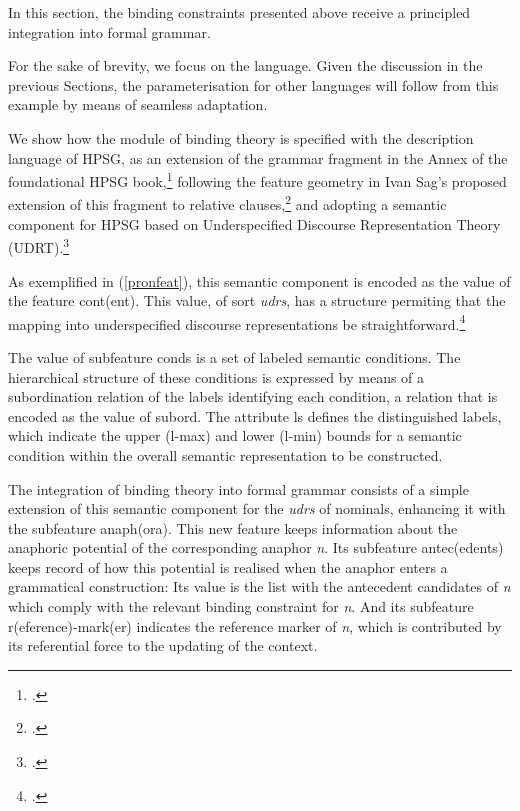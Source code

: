 \documentclass[output=paper
,modfonts
,nonflat]{langsci/langscibook}
\begin{document}
In this section, the binding constraints presented above receive
a principled integration into formal grammar. 

For the sake of brevity, 
we focus on the  language. Given the discussion in the previous Sections,
the parameterisation for other languages will follow from this example by means of seamless adaptation.

We show how the module of binding theory is specified 
with the description language of HPSG,
as an extension of the grammar fragment in the Annex of the foundational
HPSG book,\footnote{
\citep[Annex]{polsag:hpsg94}.}
following the feature geometry in Ivan Sag's proposed extension of this fragment to relative clauses,\footnote{
\citep{Sag97a}.} and adopting a semantic component 
for HPSG based on Underspecified Discourse Representation Theory (UDRT).\footnote{
\citep{frank:sem95}.}

As exemplified in (\ref{pronfeat}), this semantic component is encoded as the value of the 
feature {\sc cont(ent)}. This value, of sort \emph{udrs}, has a structure permiting that the mapping 
into underspecified discourse representations be straightforward.\footnote{
\citep{reyle:udrt93}.}


The value of subfeature {\sc conds} is a set of labeled
semantic conditions. The hierarchical structure of
these conditions is expressed by means of a subordination relation
of the labels identifying each condition, a relation that
is encoded as the value of {\sc subord}. The attribute {\sc ls} defines
the distinguished labels, which indicate the upper ({\sc l-max}) and
lower ({\sc l-min}) bounds for a semantic condition within the overall semantic
representation to be constructed.

The integration of binding theory into formal grammar consists of a simple extension 
of this semantic component for the \emph{udrs} of nominals,
enhancing it with the subfeature {\sc anaph(ora)}. This new feature keeps information 
about the anaphoric potential of the corresponding anaphor {\it n}.
Its subfeature {\sc antec(edents)} keeps record of how this potential 
is realised when the anaphor enters a grammatical construction: 
Its value is the list with the antecedent candidates of {\it n} which 
comply with the relevant binding constraint for {\it n}. 
And its subfeature {\sc r(eference)-mark(er)} indicates the reference marker 
of {\it n}, which is contributed by its referential
force to the updating of the context.
\end{document}
